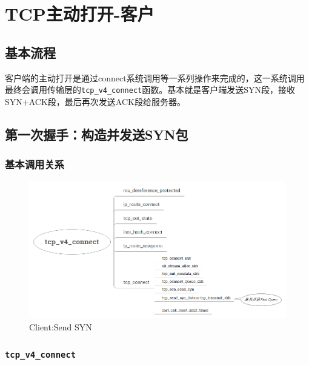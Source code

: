 \section{TCP主动打开-客户}
\label{sec:tcp_connect_client}

    \subsection{基本流程}
    \label{subsec:tcp_connect_flow}
        客户端的主动打开是通过connect系统调用等一系列操作来完成的，这一系统调用最终会调用传输层的\texttt{tcp_v4_connect}函数。基本就是客户端发送SYN段，接收SYN+ACK段，最后再次发送ACK段给服务器。

    \subsection{第一次握手：构造并发送SYN包}
    \label{subsec:tcp_connect_syn}

        \subsubsection{基本调用关系}
                \begin{figure}[htb]        
                    \centering
                    \includegraphics[width=\textwidth]{images/Client:Send_SYN.png}
                    \caption{Client:Send SYN}
                    \label{Client:Send SYN}
                \end{figure}
        \subsubsection{\texttt{tcp_v4_connect}}
            \label{Client:tcp_v4_connect}

